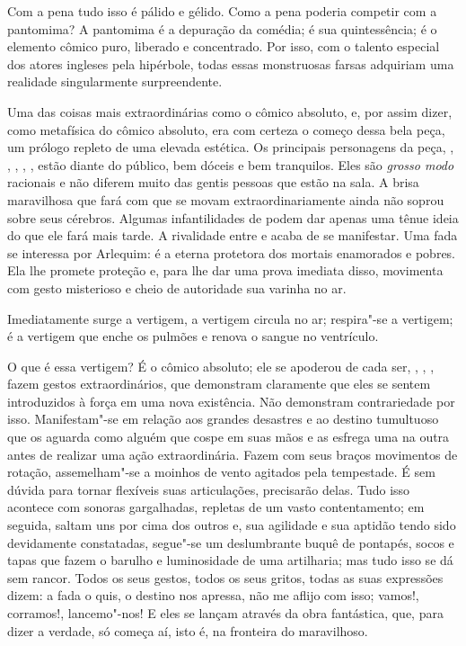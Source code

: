 Com a pena tudo isso é pálido e gélido. Como a pena poderia competir com
a pantomima? A pantomima é a depuração da comédia; é sua quintessência;
é o elemento cômico puro, liberado e concentrado. Por isso, com o
talento especial dos atores ingleses pela hipérbole, todas essas
monstruosas farsas adquiriam uma realidade singularmente surpreendente.

Uma das coisas mais extraordinárias como o cômico absoluto, e, por assim
dizer, como metafísica do cômico absoluto, era com certeza o começo
dessa bela peça, um prólogo repleto de uma elevada estética. Os
principais personagens da peça, , , , ,
, estão diante do público, bem dóceis e bem tranquilos. Eles são
\textit{grosso modo} racionais e não diferem muito das gentis pessoas
que estão na sala. A brisa maravilhosa que fará com que se movam
extraordinariamente ainda não soprou sobre seus cérebros. Algumas
infantilidades de  podem dar apenas uma tênue ideia do que ele
fará mais tarde. A rivalidade entre  e  acaba de se
manifestar. Uma fada se interessa por Arlequim: é a eterna protetora
dos mortais enamorados e pobres. Ela lhe promete proteção e, para lhe dar
uma prova imediata disso, movimenta com gesto misterioso e cheio de
autoridade sua varinha no ar.

Imediatamente surge a vertigem, a vertigem circula no ar; respira"-se a
vertigem; é a vertigem que enche os pulmões e renova o sangue no
ventrículo.

O que é essa vertigem? É o cômico absoluto; ele se apoderou de cada ser,
, , , fazem gestos extraordinários, que
demonstram claramente que eles se sentem introduzidos à força em uma
nova existência. Não demonstram contrariedade por isso. Manifestam"-se
em relação aos grandes desastres e ao destino tumultuoso que os aguarda
como alguém que cospe em suas mãos e as esfrega uma na outra antes de
realizar uma ação extraordinária. Fazem com seus braços movimentos de
rotação, assemelham"-se a moinhos de vento agitados pela tempestade. É
sem dúvida para tornar flexíveis suas articulações, precisarão delas.
Tudo isso acontece com sonoras gargalhadas, repletas de um vasto
contentamento; em seguida, saltam uns por cima dos outros e, sua
agilidade e sua aptidão tendo sido devidamente constatadas, segue"-se um
deslumbrante buquê de pontapés, socos e tapas que fazem o barulho e
luminosidade de uma artilharia; mas tudo isso se dá sem rancor. Todos
os seus gestos, todos os seus gritos, todas as suas expressões dizem: a
fada o quis, o destino nos apressa, não me aflijo com isso; vamos!,
corramos!, lancemo"-nos! E eles se lançam através da obra fantástica,
que, para dizer a verdade, só começa aí, isto é, na fronteira do
maravilhoso.

